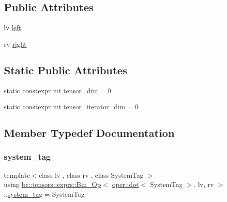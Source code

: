 \subsection*{Public Attributes}
\begin{DoxyCompactItemize}
\item 
lv \hyperlink{structbc_1_1tensors_1_1exprs_1_1Bin__Op_3_01oper_1_1dot_3_01SystemTag_01_4_00_01lv_00_01rv_01_4_a1a5f4155953dd6833d49faf2ca2d0b38}{left}
\item 
rv \hyperlink{structbc_1_1tensors_1_1exprs_1_1Bin__Op_3_01oper_1_1dot_3_01SystemTag_01_4_00_01lv_00_01rv_01_4_a9aca1e09b777dd5ca1edbbc27f59f01d}{right}
\end{DoxyCompactItemize}
\subsection*{Static Public Attributes}
\begin{DoxyCompactItemize}
\item 
static constexpr int \hyperlink{structbc_1_1tensors_1_1exprs_1_1Bin__Op_3_01oper_1_1dot_3_01SystemTag_01_4_00_01lv_00_01rv_01_4_ade712cc7a704d3aaca20f7261bcde3b6}{tensor\+\_\+dim} = 0
\item 
static constexpr int \hyperlink{structbc_1_1tensors_1_1exprs_1_1Bin__Op_3_01oper_1_1dot_3_01SystemTag_01_4_00_01lv_00_01rv_01_4_a1423485a1a24fc868a210a74349d365e}{tensor\+\_\+iterator\+\_\+dim} = 0
\end{DoxyCompactItemize}


\subsection{Member Typedef Documentation}
\mbox{\label{structbc_1_1tensors_1_1exprs_1_1Bin__Op_3_01oper_1_1dot_3_01SystemTag_01_4_00_01lv_00_01rv_01_4_aac42309fcd782d98f3d908ce98defba8}} 
\subsubsection{\texorpdfstring{system\+\_\+tag}{system\_tag}}
{\footnotesize\ttfamily template$<$class lv , class rv , class System\+Tag $>$ \\
using \hyperlink{structbc_1_1tensors_1_1exprs_1_1Bin__Op}{bc\+::tensors\+::exprs\+::\+Bin\+\_\+\+Op}$<$ \hyperlink{structbc_1_1oper_1_1dot}{oper\+::dot}$<$ System\+Tag $>$, lv, rv $>$\+::\hyperlink{structbc_1_1tensors_1_1exprs_1_1Bin__Op_3_01oper_1_1dot_3_01SystemTag_01_4_00_01lv_00_01rv_01_4_aac42309fcd782d98f3d908ce98defba8}{system\+\_\+tag} =  System\+Tag}

